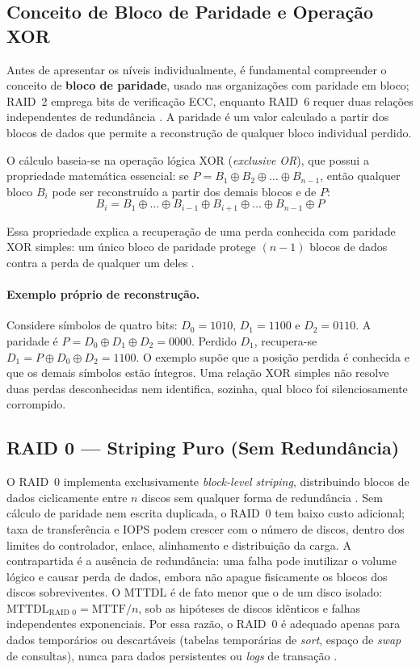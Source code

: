 \documentclass[titlepage]{article}
\begin{document}
\subsection{Conceito de Bloco de Paridade e Operação XOR}
Antes de apresentar os níveis individualmente, é fundamental compreender o conceito de \textbf{bloco de paridade}, usado nas organizações com paridade em bloco; RAID~2 emprega bits de verificação ECC, enquanto RAID~6 requer duas relações independentes de redundância \cite{silberschatz2020}. A paridade é um valor calculado a partir dos blocos de dados que permite a reconstrução de qualquer bloco individual perdido.

O cálculo baseia-se na operação lógica XOR (\textit{exclusive OR}), que possui a propriedade matemática essencial: se $P = B_1 \oplus B_2 \oplus \ldots \oplus B_{n-1}$, então qualquer bloco $B_i$ pode ser reconstruído a partir dos demais blocos e de $P$:
\begin{equation}
    B_i = B_1 \oplus \ldots \oplus B_{i-1} \oplus B_{i+1} \oplus \ldots \oplus B_{n-1} \oplus P
    \label{eq:xor_recovery}
\end{equation}

Essa propriedade explica a recuperação de uma perda conhecida com paridade XOR simples: um único bloco de paridade protege $(n-1)$ blocos de dados contra a perda de qualquer um deles \cite{silberschatz2020}.


\paragraph{Exemplo próprio de reconstrução.}
Considere símbolos de quatro bits: $D_0=1010$, $D_1=1100$ e $D_2=0110$. A paridade é $P=D_0\oplus D_1\oplus D_2=0000$. Perdido $D_1$, recupera-se $D_1=P\oplus D_0\oplus D_2=1100$. O exemplo supõe que a posição perdida é conhecida e que os demais símbolos estão íntegros. Uma relação XOR simples não resolve duas perdas desconhecidas nem identifica, sozinha, qual bloco foi silenciosamente corrompido.
\subsection{RAID 0 --- Striping Puro (Sem Redundância)}
O RAID~0 implementa exclusivamente \textit{block-level striping}, distribuindo blocos de dados ciclicamente entre $n$ discos sem qualquer forma de redundância \cite{silberschatz2020}. Sem cálculo de paridade nem escrita duplicada, o RAID~0 tem baixo custo adicional; taxa de transferência e IOPS podem crescer com o número de discos, dentro dos limites do controlador, enlace, alinhamento e distribuição da carga. A contrapartida é a ausência de redundância: uma falha pode inutilizar o volume lógico e causar perda de dados, embora não apague fisicamente os blocos dos discos sobreviventes. O MTTDL é de fato menor que o de um disco isolado: $\text{MTTDL}_{\text{RAID 0}} = \text{MTTF}/n$, sob as hipóteses de discos idênticos e falhas independentes exponenciais. Por essa razão, o RAID~0 é adequado apenas para dados temporários ou descartáveis (tabelas temporárias de \textit{sort}, espaço de \textit{swap} de consultas), nunca para dados persistentes ou \textit{logs} de transação \cite{silberschatz2020}.
\end{document}
